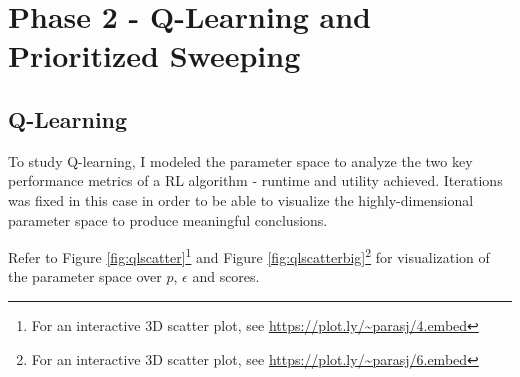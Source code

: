 \documentclass[11pt]{article}
\begin{document}
\section{Phase 2 - Q-Learning and Prioritized Sweeping}

\subsection{Q-Learning}

To study Q-learning, I modeled the parameter space to analyze the two key performance metrics of a RL algorithm - runtime and utility achieved. Iterations was fixed in this case in order to be able to visualize the highly-dimensional parameter space to produce meaningful conclusions.

Refer to Figure \ref{fig:qlscatter}\footnote{For an interactive 3D scatter plot, see \url{https://plot.ly/~parasj/4.embed}} and Figure \ref{fig:qlscatterbig}\footnote{For an interactive 3D scatter plot, see \url{https://plot.ly/~parasj/6.embed}} for visualization of the parameter space over $p$, $\epsilon$ and scores.

\begin{figure}[h]
    \begin{floatrow}
    \end{floatrow}
\end{figure}
\end{document}
